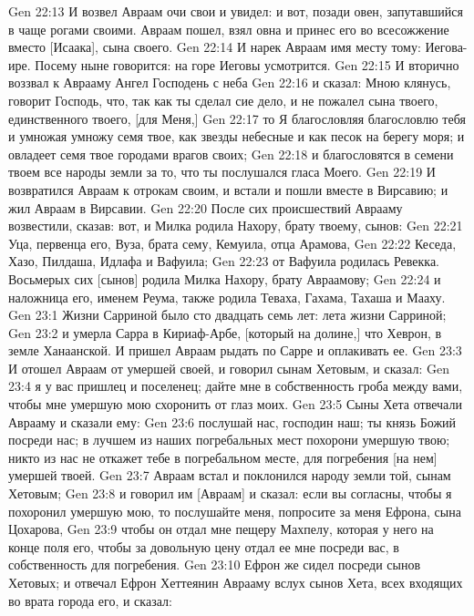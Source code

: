 \vs Gen 22:13 И возвел Авраам очи свои и увидел: и вот, позади овен, запутавшийся в чаще рогами своими. Авраам пошел, взял овна и принес его во всесожжение вместо [Исаака], сына своего.
\vs Gen 22:14 И нарек Авраам имя месту тому: Иегова-ире. Посему  ныне говорится: на горе Иеговы усмотрится.
\vs Gen 22:15 И вторично воззвал к Аврааму Ангел Господень с неба
\vs Gen 22:16 и сказал: Мною клянусь, говорит Господь, что, так как ты сделал сие дело, и не пожалел сына твоего, единственного твоего, [для Меня,]
\vs Gen 22:17 то Я благословляя благословлю тебя и умножая умножу семя твое, как звезды небесные и как песок на берегу моря; и овладеет семя твое городами врагов своих;
\vs Gen 22:18 и благословятся в семени твоем все народы земли за то, что ты послушался гласа Моего.
\vs Gen 22:19 И возвратился Авраам к отрокам своим, и встали и пошли вместе в Вирсавию; и жил Авраам в Вирсавии.
\rsbpar\vs Gen 22:20 После сих происшествий Аврааму возвестили, сказав: вот, и Милка родила Нахору, брату твоему, сынов:
\vs Gen 22:21 Уца, первенца его, Вуза, брата сему, Кемуила, отца Арамова,
\vs Gen 22:22 Кеседа, Хазо, Пилдаша, Идлафа и Вафуила;
\vs Gen 22:23 от Вафуила родилась Ревекка. Восьмерых сих [сынов] родила Милка Нахору, брату Авраамову;
\vs Gen 22:24 и наложница его, именем Реума, также родила Теваха, Гахама, Тахаша и Мааху.
\vs Gen 23:1 Жизни Сарриной было сто двадцать семь лет:  лета жизни Сарриной;
\vs Gen 23:2 и умерла Сарра в Кириаф-Арбе, [который на долине,] что  Хеврон, в земле Ханаанской. И пришел Авраам рыдать по Сарре и оплакивать ее.
\vs Gen 23:3 И отошел Авраам от умершей своей, и говорил сынам Хетовым, и сказал:
\vs Gen 23:4 я у вас пришлец и поселенец; дайте мне в собственность  гроба между вами, чтобы мне умершую мою схоронить от глаз моих.
\vs Gen 23:5 Сыны Хета отвечали Аврааму и сказали ему:
\vs Gen 23:6 послушай нас, господин наш; ты князь Божий посреди нас; в лучшем из наших погребальных мест похорони умершую твою; никто из нас не откажет тебе в погребальном месте, для погребения [на нем] умершей твоей.
\vs Gen 23:7 Авраам встал и поклонился народу земли той, сынам Хетовым;
\vs Gen 23:8 и говорил им [Авраам] и сказал: если вы согласны, чтобы я похоронил умершую мою, то послушайте меня, попросите за меня Ефрона, сына Цохарова,
\vs Gen 23:9 чтобы он отдал мне пещеру Махпелу, которая у него на конце поля его, чтобы за довольную цену отдал ее мне посреди вас, в собственность для погребения.
\vs Gen 23:10 Ефрон же сидел посреди сынов Хетовых; и отвечал Ефрон Хеттеянин Аврааму вслух сынов Хета, всех входящих во врата города его, и сказал:
